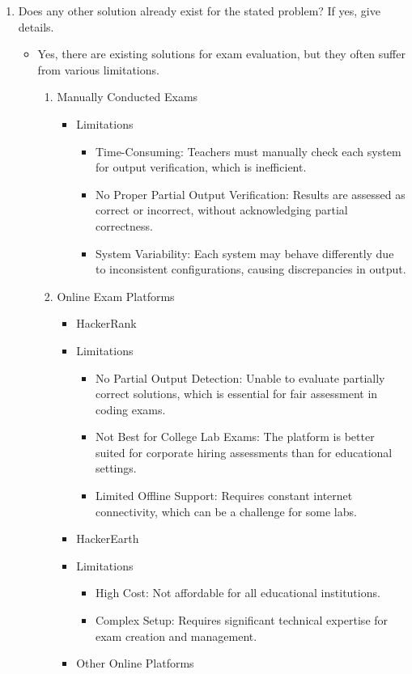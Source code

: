 \documentclass[14pt]{article}
\begin{document}
\begin{enumerate}
\item Does any other solution already exist for the stated problem? If yes, give details.
\begin{itemize}
\item Yes, there are existing solutions for exam evaluation, but they often suffer from various limitations.
\begin{enumerate}
\item Manually Conducted Exams
\begin{itemize}
\item {Limitations}
\begin{itemize}
\item Time-Consuming: Teachers must manually check each system for output verification, which is inefficient.  
\item No Proper Partial Output Verification: Results are assessed as correct or incorrect, without acknowledging partial correctness.  
\item System Variability: Each system may behave differently due to inconsistent configurations, causing discrepancies in output.  
\end{itemize}
\end{itemize}
\item Online Exam Platforms
\begin{itemize}
\item HackerRank
\item {Limitations}
\begin{itemize}
\item No Partial Output Detection: Unable to evaluate partially correct solutions, which is essential for fair assessment in coding exams.  
\item Not Best for College Lab Exams: The platform is better suited for corporate hiring assessments than for educational settings.  
\item Limited Offline Support: Requires constant internet connectivity, which can be a challenge for some labs.  
\end{itemize}
\item HackerEarth
\item {Limitations}
\begin{itemize}
\item High Cost: Not affordable for all educational institutions.  
\item Complex Setup: Requires significant technical expertise for exam creation and management.  
\end{itemize}
\item Other Online Platforms

\end{itemize}
\end{enumerate}
\end{itemize}
\end{enumerate}
\end{document}
